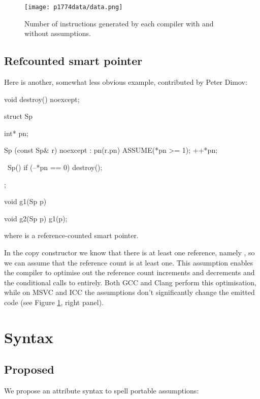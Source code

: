 \begin{figure}[!htbp]
  \texttt{[image: p1774data/data.png]}
  \caption{Number of instructions generated by each compiler with and without assumptions.}
  \label{fig:codesize}
\end{figure}

\subsection{Refcounted smart pointer}

Here is another, somewhat less obvious example, contributed by Peter Dimov:

\begin{codeblock}
void destroy() noexcept;

struct Sp {
  int* pn;

  Sp (const Sp& r) noexcept : pn(r.pn) {
    ASSUME(*pn >= 1);
    ++*pn;
  }

  ~Sp() {
    if (--*pn == 0) 
    destroy();
  }
};

void g1(Sp p) {}

void g2(Sp p) {
  g1(p);
}
\end{codeblock}

where  is a reference-counted smart pointer.

In the copy constructor we
know that there is at least one reference, namely , so we can assume that
the reference count is at least one. This assumption enables the compiler to optimise out
the reference count increments and decrements and the conditional calls to
 entirely. Both GCC and Clang perform this optimisation, while on MSVC and ICC the assumptions don't significantly change the emitted code (see Figure \ref{fig:codesize}, right panel).




\section{Syntax}
\label{sec:syntax}

\subsection{Proposed}

We propose an attribute syntax to spell portable assumptions:

\forceindent
{}

